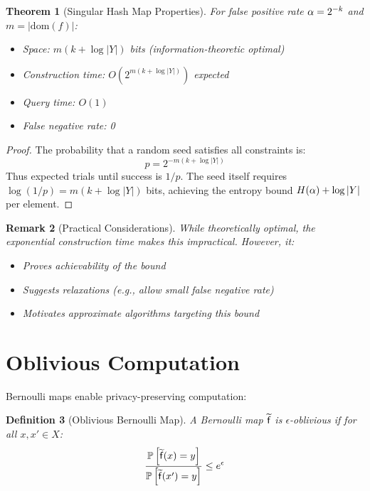\documentclass[11pt,final,hidelinks]{article}
\newtheorem{theorem}{Theorem}[section]
\newtheorem{definition}[theorem]{Definition}
\newtheorem{remark}[theorem]{Remark}
\newcommand{\AFun}[1]{\obs{\mathsf{#1}}}  %
\newcommand{\Set}[1]{#1}              %
\begin{document}
\begin{theorem}[Singular Hash Map Properties]
For false positive rate $\alpha = 2^{-k}$ and $m = |\text{dom}(f)|$:
\begin{itemize}
    \item Space: $m(k + \log |Y|)$ bits (information-theoretic optimal)
    \item Construction time: $O(2^{m(k + \log |Y|)})$ expected
    \item Query time: $O(1)$
    \item False negative rate: 0
\end{itemize}
\end{theorem}

\begin{proof}
The probability that a random seed satisfies all constraints is:
\begin{equation}
p = 2^{-m(k + \log |Y|)}
\end{equation}
Thus expected trials until success is $1/p$. The seed itself requires $\log(1/p) = m(k + \log |Y|)$ bits, achieving the entropy bound $H(\alpha) + \log |Y|$ per element.
\end{proof}

\begin{remark}[Practical Considerations]
While theoretically optimal, the exponential construction time makes this impractical. However, it:
\begin{itemize}
    \item Proves achievability of the bound
    \item Suggests relaxations (e.g., allow small false negative rate)
    \item Motivates approximate algorithms targeting this bound
\end{itemize}
\end{remark}

\section{Oblivious Computation}

Bernoulli maps enable privacy-preserving computation:

\begin{definition}[Oblivious Bernoulli Map]
A Bernoulli map $\AFun{f}$ is $\epsilon$-oblivious if for all $x, x' \in \Set{X}$:
\begin{equation}
\frac{\Prob{\AFun{f}(x) = y}}{\Prob{\AFun{f}(x') = y}} \leq e^\epsilon
\end{equation}
\end{definition}
\end{document}
